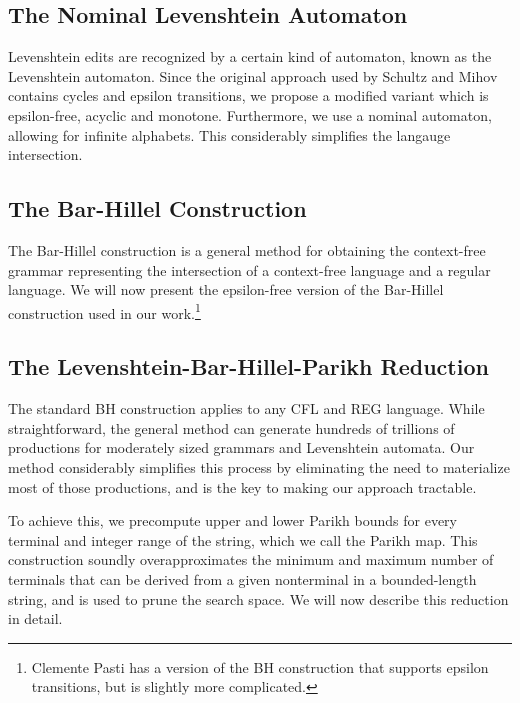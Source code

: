\subsection{The Nominal Levenshtein Automaton}

Levenshtein edits are recognized by a certain kind of automaton, known as the Levenshtein automaton. Since the original approach used by Schultz and Mihov contains cycles and epsilon transitions, we propose a modified variant which is epsilon-free, acyclic and monotone. Furthermore, we use a nominal automaton, allowing for infinite alphabets. This considerably simplifies the langauge intersection.

\subsection{The Bar-Hillel Construction}

The Bar-Hillel construction is a general method for obtaining the context-free grammar representing the intersection of a context-free language and a regular language. We will now present the epsilon-free version of the Bar-Hillel construction used in our work.\footnote{Clemente Pasti has a version of the BH construction that supports epsilon transitions, but is slightly more complicated.}

\subsection{The Levenshtein-Bar-Hillel-Parikh Reduction}

The standard BH construction applies to any CFL and REG language. While straightforward, the general method can generate hundreds of trillions of productions for moderately sized grammars and Levenshtein automata. Our method considerably simplifies this process by eliminating the need to materialize most of those productions, and is the key to making our approach tractable.

To achieve this, we precompute upper and lower Parikh bounds for every terminal and integer range of the string, which we call the Parikh map. This construction soundly overapproximates the minimum and maximum number of terminals that can be derived from a given nonterminal in a bounded-length string, and is used to prune the search space. We will now describe this reduction in detail.